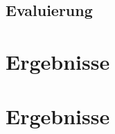 \documentclass{Vorlage}
\begin{document}
\subsection{Evaluierung}

\section{Ergebnisse}




\section{Ergebnisse}

\clearpage



 





\clearpage

\end{document}
